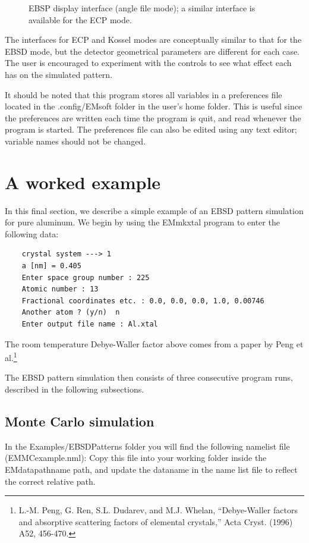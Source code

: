 \documentclass[DIV=calc, paper=letter, fontsize=11pt]{scrartcl}	 %
\begin{document}
\begin{figure}[h]
\leavevmode\centering
\epsfxsize=3in
\caption{\label{fig:EBSP2}EBSP display interface (angle file mode); a similar interface is available for the ECP mode.}
\end{figure}


The interfaces for ECP and Kossel modes are conceptually similar to that for the EBSD mode, but the detector geometrical parameters are 
different for each case.  The user is encouraged to experiment with the controls to see what effect each has on the simulated pattern.

It should be noted that this program stores all variables in a preferences file located in the \textsf{.config/EMsoft} folder in the user's home
folder.  This is useful since the preferences are written each time the program is quit, and read whenever the program is started.  The preferences
file can also be edited using any text editor; variable names should not be changed.

\clearpage
\section{A worked example\label{sec:examples}}
In this final section, we describe a simple example of an EBSD pattern simulation for pure aluminum.  We begin by using the 
\textsf{EMmkxtal} program to enter the following data:
\begin{verbatim}
	crystal system ---> 1
	a [nm] = 0.405
	Enter space group number : 225
	Atomic number : 13
	Fractional coordinates etc. : 0.0, 0.0, 0.0, 1.0, 0.00746
	Another atom ? (y/n)  n
	Enter output file name : Al.xtal
\end{verbatim}
The room temperature Debye-Waller factor above comes from a paper by Peng et al.\footnote{L.-M. Peng, G. Ren, S.L. Dudarev, and M.J. Whelan,
``Debye-Waller factors and absorptive scattering factors of elemental crystals,'' Acta Cryst. (1996) A52, 456-470.}

The EBSD pattern simulation then consists of three consecutive program runs, described in the following subsections.

\subsection{Monte Carlo simulation}
In the \textsf{Examples/EBSDPatterns} folder you will find the following namelist file (EMMCexample.nml):
Copy this file into your working folder inside the \textsf{EMdatapathname} path, and update the \textsf{dataname}
in the name list file to reflect the correct relative path.
 
\end{document}
